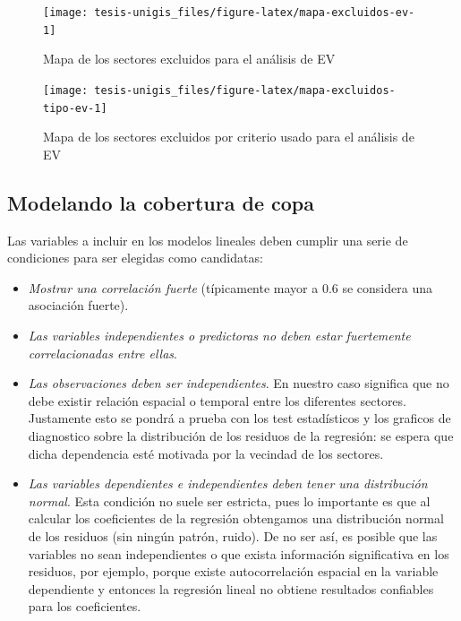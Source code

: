 \documentclass[12pt,]{book}
\providecommand{\tightlist}{%
  \setlength{\itemsep}{0pt}\setlength{\parskip}{0pt}}
\begin{document}
\begin{figure}
\texttt{[image: tesis-unigis\_files/figure-latex/mapa-excluidos-ev-1]} \caption{Mapa de los sectores excluidos para el análisis de EV}\label{fig:mapa-excluidos-ev}
\end{figure}

\begin{figure}
\texttt{[image: tesis-unigis\_files/figure-latex/mapa-excluidos-tipo-ev-1]} \caption{Mapa de los sectores excluidos por criterio usado para el análisis de EV}\label{fig:mapa-excluidos-tipo-ev}
\end{figure}

\subsection{Modelando la cobertura de
copa}\label{modelando-la-cobertura-de-copa}

Las variables a incluir en los modelos lineales deben cumplir una serie
de condiciones para ser elegidas como candidatas:

\begin{itemize}
\tightlist
\item
  \emph{Mostrar una correlación fuerte} (típicamente mayor a 0.6 se
  considera una asociación fuerte).
\item
  \emph{Las variables independientes o predictoras no deben estar
  fuertemente correlacionadas entre ellas}.
\item
  \emph{Las observaciones deben ser independientes}. En nuestro caso
  significa que no debe existir relación espacial o temporal entre los
  diferentes sectores. Justamente esto se pondrá a prueba con los test
  estadísticos y los graficos de diagnostico sobre la distribución de
  los residuos de la regresión: se espera que dicha dependencia esté
  motivada por la vecindad de los sectores.
\item
  \emph{Las variables dependientes e independientes deben tener una
  distribución normal}. Esta condición no suele ser estricta, pues lo
  importante es que al calcular los coeficientes de la regresión
  obtengamos una distribución normal de los residuos (sin ningún patrón,
  ruido). De no ser así, es posible que las variables no sean
  independientes o que exista información significativa en los residuos,
  por ejemplo, porque existe autocorrelación espacial en la variable
  dependiente y entonces la regresión lineal no obtiene resultados
  confiables para los coeficientes.
\end{itemize}
\end{document}
